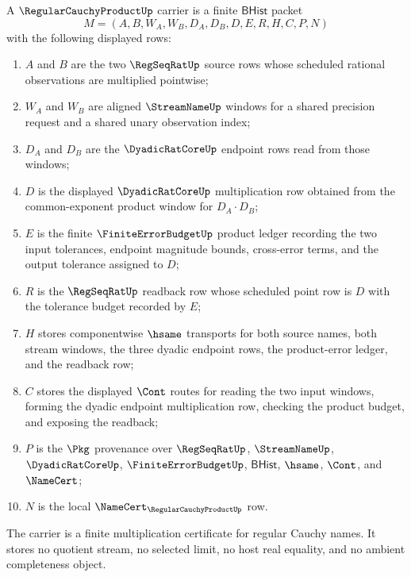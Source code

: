 \begin{definition}
\label{def:regular-cauchy-product-carrier}
A $\RegularCauchyProductUp$ carrier is a finite $\mathsf{BHist}$ packet
$$
M=(A,B,W_A,W_B,D_A,D_B,D,E,R,H,C,P,N)
$$
with the following displayed rows:
\begin{enumerate}
\item $A$ and $B$ are the two $\RegSeqRatUp$ source rows whose scheduled rational observations are multiplied pointwise;
\item $W_A$ and $W_B$ are aligned $\StreamNameUp$ windows for a shared precision request and a shared unary observation index;
\item $D_A$ and $D_B$ are the $\DyadicRatCoreUp$ endpoint rows read from those windows;
\item $D$ is the displayed $\DyadicRatCoreUp$ multiplication row obtained from the common-exponent product window for $D_A \cdot D_B$;
\item $E$ is the finite $\FiniteErrorBudgetUp$ product ledger recording the two input tolerances, endpoint magnitude bounds, cross-error terms, and the output tolerance assigned to $D$;
\item $R$ is the $\RegSeqRatUp$ readback row whose scheduled point row is $D$ with the tolerance budget recorded by $E$;
\item $H$ stores componentwise $\hsame$ transports for both source names, both stream windows, the three dyadic endpoint rows, the product-error ledger, and the readback row;
\item $C$ stores the displayed $\Cont$ routes for reading the two input windows, forming the dyadic endpoint multiplication row, checking the product budget, and exposing the readback;
\item $P$ is the $\Pkg$ provenance over $\RegSeqRatUp$, $\StreamNameUp$, $\DyadicRatCoreUp$, $\FiniteErrorBudgetUp$, $\mathsf{BHist}$, $\hsame$, $\Cont$, and $\NameCert$;
\item $N$ is the local $\NameCert_{\RegularCauchyProductUp}$ row.
\end{enumerate}
The carrier is a finite multiplication certificate for regular Cauchy names. It stores no quotient stream, no selected limit, no host real equality, and no ambient completeness object.
\end{definition}

